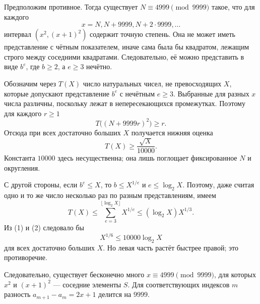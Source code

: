 Предположим противное. Тогда существует $N\equiv4999\pmod{9999}$ такое, что для каждого
\[
 x=N,N+9999,N+2\cdot9999,\dots
\]
интервал $(x^2,(x+1)^2)$ содержит точную степень. Она не может иметь представление с чётным показателем, иначе сама была бы квадратом, лежащим строго между соседними квадратами. Следовательно, её можно представить в виде $b^e$, где $b\geq2$, а $e\geq3$ нечётно.

Обозначим через $T(X)$ число натуральных чисел, не превосходящих $X$, которые допускают представление $b^e$ с нечётным $e\geq3$. Выбранные для разных $x$ числа различны, поскольку лежат в непересекающихся промежутках. Поэтому для каждого $r\geq1$
\[
 T\bigl((N+9999r)^2\bigr)\geq r.
\]
Отсюда при всех достаточно больших $X$ получается нижняя оценка
\[
 T(X)\geq \frac{\sqrt X}{10000}. \tag{1}
\]
Константа $10000$ здесь несущественна; она лишь поглощает фиксированное $N$ и округления.

С другой стороны, если $b^e\leq X$, то $b\leq X^{1/e}$ и $e\leq\log_2X$. Поэтому, даже считая одно и то же число несколько раз по разным представлениям, имеем
\[
 T(X)\leq\sum_{e=3}^{\lfloor\log_2X\rfloor}\!X^{1/e}
 \leq(\log_2X)X^{1/3}. \tag{2}
\]
Из (1) и (2) следовало бы
\[
 X^{1/6}\leq10000\log_2X
\]
для всех достаточно больших $X$. Но левая часть растёт быстрее правой; это противоречие.

Следовательно, существует бесконечно много $x\equiv4999\pmod{9999}$, для которых $x^2$ и $(x+1)^2$ --- соседние элементы $S$. Для соответствующих индексов $m$ разность $a_{m+1}-a_m=2x+1$ делится на $9999$.


